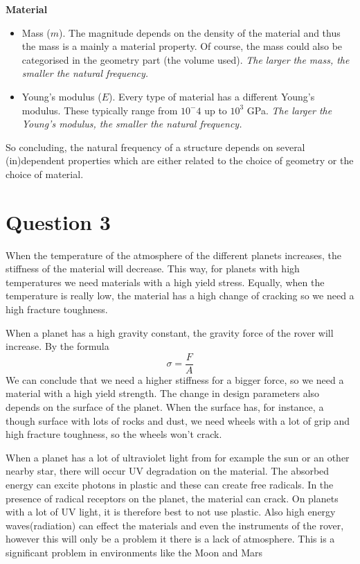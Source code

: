 \textbf{Material}
\begin{itemize}
    \item Mass ($m$). The magnitude depends on the density of the material and thus the mass is a mainly a material property.
    Of course, the mass could also be categorised in the geometry part (the volume used). \textit{The larger the mass, the smaller the natural frequency.}
    \item Young's modulus ($E$). Every type of material has a different Young's modulus. These typically range from $10^-4$ up to $10^3$ GPa. \textit{The larger the Young's modulus, the smaller the natural frequency.}
\end{itemize}
So concluding, the natural frequency of a structure depends on several (in)dependent properties which are either related to the choice of geometry or the choice of material.

\section{Question 3}
When the temperature of the atmosphere of the different planets increases, the stiffness of the material will decrease. This way, for planets with high temperatures we need materials with a high yield stress. Equally, when the temperature is really low, the material has a high change of cracking so we need a high fracture toughness.

When a planet has a high gravity constant, the gravity force of the rover will increase. By the formula 
\begin{equation} \sigma = \frac{F}{A}
\end{equation}
We can conclude that we need a higher stiffness for a bigger force, so we need a material with a high yield strength.
The change in design parameters also depends on the surface of the planet. When the surface has, for instance, a though surface with lots of rocks and dust, we need wheels with a lot of grip and high fracture toughness, so the wheels won't crack. 

When a planet has a lot of ultraviolet light from for example the sun or an other nearby star, there will occur UV degradation on the material. The absorbed energy can excite photons in plastic and these can create free radicals. In the presence of radical receptors on the planet, the material can crack. On planets with a lot of UV light, it is therefore best to not use plastic. Also high energy waves(radiation) can effect the materials and even the instruments of the rover, however this will only be a problem it there is a lack of atmosphere. This is a significant problem in environments like the Moon and Mars


